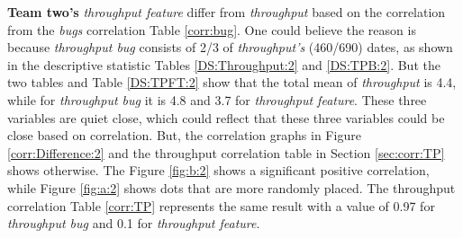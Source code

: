 \documentclass[UKenglish]{ifimaster}  %
\begin{document}
\textbf{Team two's} \textit{throughput feature} differ from \textit{throughput} based on the correlation  from the \textit{bugs} correlation Table \ref{corr:bug}. One could believe the reason is because \textit{throughput bug} consists of 2/3 of \textit{throughput's} (460/690) dates, as shown in the descriptive statistic Tables \ref{DS:Throughput:2} and \ref{DS:TPB:2}. But the two tables and Table \ref{DS:TPFT:2} show that the total mean of \textit{throughput} is 4.4, while for \textit{throughput bug} it is 4.8 and 3.7 for \textit{throughput feature}. These three variables are quiet close, which could reflect that these three variables could be close based on correlation. 
But, the correlation graphs in Figure \ref{corr:Difference:2} and the throughput correlation table in Section \ref{sec:corr:TP} shows otherwise. The Figure \ref{fig:b:2} shows a significant positive correlation, while Figure \ref{fig:a:2} shows dots that are more randomly placed. The throughput correlation Table \ref{corr:TP} represents the same result with a value of 0.97 for \textit{throughput bug} and  0.1 for \textit{throughput feature}.
\end{document}
